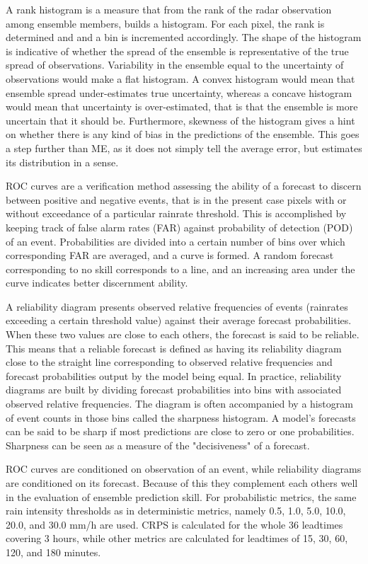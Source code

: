 A rank histogram is a measure that from the rank of the radar observation among ensemble members, builds a histogram. For each pixel, the rank is determined and and a bin is incremented accordingly. The shape of the histogram is indicative of  whether the spread of the ensemble is representative of the true spread of observations. Variability in the ensemble equal to the uncertainty of observations would make a flat histogram. A convex histogram would mean that ensemble spread under-estimates true uncertainty, whereas a concave histogram would mean that uncertainty is over-estimated, that is that the ensemble is more uncertain that it should be. Furthermore, skewness of the histogram gives a hint on whether there is any kind of bias in the predictions of the ensemble. This goes a step further than ME, as it does not simply tell the average error, but estimates its distribution in a sense. 


ROC curves \cite{mason1982model} are a verification method assessing the ability of a forecast to discern between positive and negative events, that is in the present case pixels with or without exceedance of a particular rainrate threshold. This is accomplished by keeping track of false alarm rates (FAR) against probability of detection (POD) of an event. Probabilities are divided into a certain number of bins over which corresponding FAR are averaged, and a curve is formed. A random forecast corresponding to no skill corresponds to a line, and an increasing area under the curve indicates better discernment ability. 

A reliability diagram presents observed relative frequencies of events (rainrates exceeding a certain threshold value) against their average forecast probabilities. When these two values are close to each others, the forecast is said to be reliable. This means that a reliable forecast is defined as having its reliability diagram close to the straight line corresponding to observed relative frequencies and forecast probabilities output by the model being equal. In practice, reliability diagrams are built by dividing forecast probabilities into bins with associated observed relative frequencies. The diagram is often accompanied by a histogram of event counts in those bins called the sharpness histogram. A model's forecasts can be said to be sharp if most predictions are close to zero or one probabilities. Sharpness can be seen as a measure of the "decisiveness" of a forecast.

ROC curves are conditioned on observation of an event, while reliability diagrams are conditioned on its forecast. Because of this they complement each others well in the evaluation of ensemble prediction skill. For probabilistic metrics, the same rain intensity thresholds as in deterministic metrics, namely 0.5, 1.0, 5.0, 10.0, 20.0, and 30.0 mm/h are used. CRPS is calculated for the whole 36 leadtimes covering 3 hours, while other metrics are calculated for leadtimes of 15, 30, 60, 120, and 180 minutes. 

